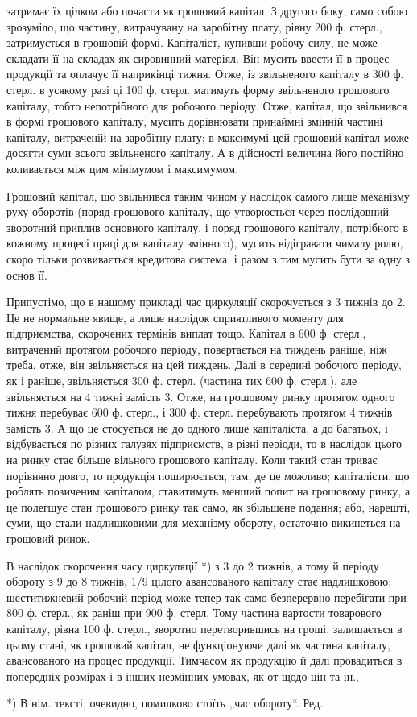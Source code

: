 затримає їх цілком або почасти як грошовий капітал. З другого боку,
само собою зрозуміло, що частину, витрачувану на заробітну плату,
рівну 200 ф. стерл., затримується в грошовій формі. Капіталіст, купивши
робочу силу, не може складати її на складах як сировинний матеріял.
Він мусить ввести її в процес продукції та оплачує її наприкінці тижня.
Отже, із звільненого капіталу в 300 ф. стерл. в усякому разі ці 100 ф.
стерл. матимуть форму звільненого грошового капіталу, тобто непотрібного
для робочого періоду. Отже, капітал, що звільнився в формі грошового
капіталу, мусить дорівнювати принаймні змінній частині капіталу,
витраченій на заробітну плату; в максимумі цей грошовий капітал може
досягти суми всього звільненого капіталу. А в дійсності величина його
постійно коливається між цим мінімумом і максимумом.

Грошовий капітал, що звільнився таким чином у наслідок самого
лише механізму руху оборотів (поряд грошового капіталу, що утворюється
через послідовний зворотний приплив основного капіталу, і поряд грошового
капіталу, потрібного в кожному процесі праці для капіталу змінного),
мусить відігравати чималу ролю, скоро тільки розвивається кредитова
система, і разом з тим мусить бути за одну з основ її.

Припустімо, що в нашому прикладі час циркуляції скорочується
з 3 тижнів до 2. Це не нормальне явище, а лише наслідок сприятливого
моменту для підприємства, скорочених термінів виплат тощо. Капітал
в 600 ф. стерл., витрачений протягом робочого періоду, повертається на
тиждень раніше, ніж треба, отже, він звільняється на цей тиждень. Далі
в середині робочого періоду, як і раніше, звільняється 300 ф. стерл.
(частина тих 600 ф. стерл.), але звільняється на 4 тижні замість 3.
Отже, на грошовому ринку протягом одного тижня перебуває 600 ф.
стерл., і 300 ф. стерл. перебувають протягом 4 тижнів замість 3. А що це
стосується не до одного лише капіталіста, а до багатьох, і відбувається по
різних галузях підприємств, в різні періоди, то в наслідок цього на ринку
стає більше вільного грошового капіталу. Коли такий стан триває порівняно
довго, то продукція поширюється, там, де це можливо; капіталісти,
що роблять позиченим капіталом, ставитимуть менший попит на грошовому
ринку, а це полегшує стан грошового ринку так само, як збільшене
подання; або, нарешті, суми, що стали надлишковими для механізму
обороту, остаточно викинеться на грошовий ринок.

В наслідок скорочення часу циркуляції *) з 3 до 2 тижнів, а тому й
періоду обороту з 9 до 8 тижнів, 1/9 цілого авансованого капіталу
стає надлишковою; шеститижневий робочий період може тепер так само
безперервно перебігати при 800 ф. стерл., як раніш при 900 ф. стерл.
Тому частина вартости товарового капіталу, рівна 100 ф. стерл., зворотно
перетворившись на гроші, залишається в цьому стані, як грошовий
капітал, не функціонуючи далі як частина капіталу, авансованого на
процес продукції. Тимчасом як продукцію й далі провадиться в попередніх
розмірах і в інших незмінних умовах, як от щодо цін та ін.,

*) В нім. тексті, очевидно, помилково стоїть „час обороту“. Ред.
